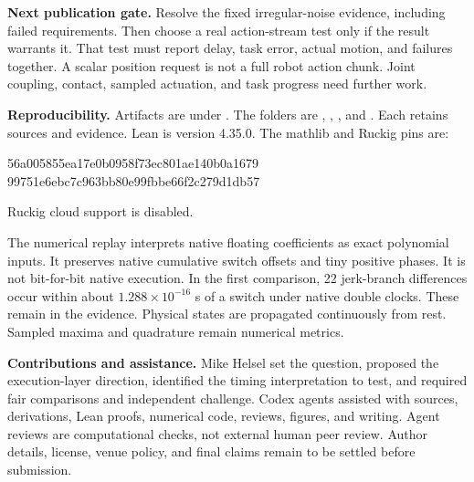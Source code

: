 \documentclass[11pt,letterpaper]{article}
\begin{document}
\textbf{Next publication gate.} Resolve the fixed irregular-noise evidence, including failed requirements. Then choose a real action-stream test only if the result warrants it. That test must report delay, task error, actual motion, and failures together. A scalar position request is not a full robot action chunk. Joint coupling, contact, sampled actuation, and task progress need further work.

\textbf{Reproducibility.} Artifacts are under . The folders are , , , and . Each retains sources and evidence. Lean is version 4.35.0. The mathlib and Ruckig pins are:
\begin{center}\small\ttfamily
56a005855ea17e0b0958f73ec801ae140b0a1679\\
99751e6ebc7c963bb80e99fbbe66f2c279d1db57
\end{center}
Ruckig cloud support is disabled.

The numerical replay interprets native floating coefficients as exact polynomial inputs. It preserves native cumulative switch offsets and tiny positive phases. It is not bit-for-bit native execution. In the first comparison, 22 jerk-branch differences occur within about $1.288\times10^{-16}$ s of a switch under native double clocks. These remain in the evidence. Physical states are propagated continuously from rest. Sampled maxima and quadrature remain numerical metrics.

\textbf{Contributions and assistance.} Mike Helsel set the question, proposed the execution-layer direction, identified the timing interpretation to test, and required fair comparisons and independent challenge. Codex agents assisted with sources, derivations, Lean proofs, numerical code, reviews, figures, and writing. Agent reviews are computational checks, not external human peer review. Author details, license, venue policy, and final claims remain to be settled before submission.
\end{document}
